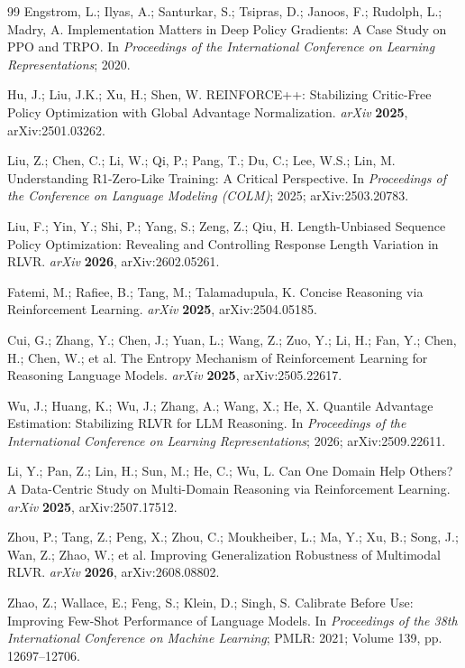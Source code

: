 \begin{thebibliography}{99}
 Engstrom, L.; Ilyas, A.; Santurkar, S.; Tsipras, D.; Janoos, F.; Rudolph, L.; Madry, A. Implementation Matters in Deep Policy Gradients: A Case Study on PPO and TRPO. In \emph{Proceedings of the International Conference on Learning Representations}; 2020.

 Hu, J.; Liu, J.K.; Xu, H.; Shen, W. REINFORCE++: Stabilizing Critic-Free Policy Optimization with Global Advantage Normalization. \emph{arXiv} \textbf{2025}, arXiv:2501.03262.

 Liu, Z.; Chen, C.; Li, W.; Qi, P.; Pang, T.; Du, C.; Lee, W.S.; Lin, M. Understanding R1-Zero-Like Training: A Critical Perspective. In \emph{Proceedings of the Conference on Language Modeling (COLM)}; 2025; arXiv:2503.20783.

 Liu, F.; Yin, Y.; Shi, P.; Yang, S.; Zeng, Z.; Qiu, H. Length-Unbiased Sequence Policy Optimization: Revealing and Controlling Response Length Variation in RLVR. \emph{arXiv} \textbf{2026}, arXiv:2602.05261.

 Fatemi, M.; Rafiee, B.; Tang, M.; Talamadupula, K. Concise Reasoning via Reinforcement Learning. \emph{arXiv} \textbf{2025}, arXiv:2504.05185.

 Cui, G.; Zhang, Y.; Chen, J.; Yuan, L.; Wang, Z.; Zuo, Y.; Li, H.; Fan, Y.; Chen, H.; Chen, W.; et al. The Entropy Mechanism of Reinforcement Learning for Reasoning Language Models. \emph{arXiv} \textbf{2025}, arXiv:2505.22617.

 Wu, J.; Huang, K.; Wu, J.; Zhang, A.; Wang, X.; He, X. Quantile Advantage Estimation: Stabilizing RLVR for LLM Reasoning. In \emph{Proceedings of the International Conference on Learning Representations}; 2026; arXiv:2509.22611.

 Li, Y.; Pan, Z.; Lin, H.; Sun, M.; He, C.; Wu, L. Can One Domain Help Others? A Data-Centric Study on Multi-Domain Reasoning via Reinforcement Learning. \emph{arXiv} \textbf{2025}, arXiv:2507.17512.

 Zhou, P.; Tang, Z.; Peng, X.; Zhou, C.; Moukheiber, L.; Ma, Y.; Xu, B.; Song, J.; Wan, Z.; Zhao, W.; et al. Improving Generalization Robustness of Multimodal RLVR. \emph{arXiv} \textbf{2026}, arXiv:2608.08802.

 Zhao, Z.; Wallace, E.; Feng, S.; Klein, D.; Singh, S. Calibrate Before Use: Improving Few-Shot Performance of Language Models. In \emph{Proceedings of the 38th International Conference on Machine Learning}; PMLR: 2021; Volume 139, pp. 12697--12706.


\end{thebibliography}
